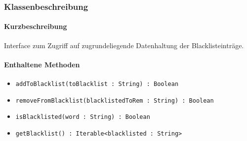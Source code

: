 \subsubsection*{Klassenbeschreibung}%
\paragraph*{Kurzbeschreibung}
Interface zum Zugriff auf zugrundeliegende Datenhaltung der Blacklisteinträge.
\paragraph*{Enthaltene Methoden}
\begin{itemize}
    \item \texttt{addToBlacklist(toBlacklist : String) : Boolean}
    \item \texttt{removeFromBlacklist(blacklistedToRem : String) : Boolean}
    \item \texttt{isBlacklisted(word : String) : Boolean}
    \item \texttt{getBlacklist() : Iterable<blacklisted : String>}
\end{itemize}
